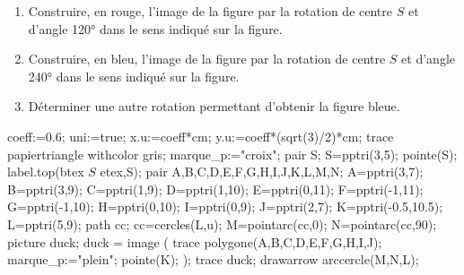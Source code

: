 \begin{exercice*}
    \begin{enumerate}
        \item Construire, en rouge, l'image de la figure par la rotation de centre $S$ et d'angle \ang{120} dans le sens indiqué sur la figure.
        \item Construire, en bleu, l'image de la figure par la rotation de centre $S$ et d'angle \ang{240} dans le sens indiqué sur la figure.
        \item Déterminer une autre rotation permettant d'obtenir la figure bleue.
    \end{enumerate}
    \begin{Geometrie}[CoinHD={(7u,6u)}]
        coeff:=0.6;
        uni:=true;
        x.u:=coeff*cm;
        y.u:=coeff*(sqrt(3)/2)*cm;
        trace papiertriangle withcolor gris;
        marque_p:="croix";
        pair S;
        S=pptri(3,5);    
        pointe(S);
        label.top(btex $S$ etex,S);
        pair A,B,C,D,E,F,G,H,I,J,K,L,M,N;
        A=pptri(3,7);
        B=pptri(3,9);
        C=pptri(1,9);
        D=pptri(1,10);
        E=pptri(0,11);
        F=pptri(-1,11);
        G=pptri(-1,10);
        H=pptri(0,10);
        I=pptri(0,9);
        J=pptri(2,7);
        K=pptri(-0.5,10.5);
        L=pptri(5,9);
        path cc;
        cc=cercles(L,u);
        M=pointarc(cc,0);
        N=pointarc(cc,90);
        picture duck;
        duck = image ( 
            trace polygone(A,B,C,D,E,F,G,H,I,J);         
            marque_p:="plein";
            pointe(K);
        );
        trace duck;
        drawarrow arccercle(M,N,L);
    \end{Geometrie}
\end{exercice*}

